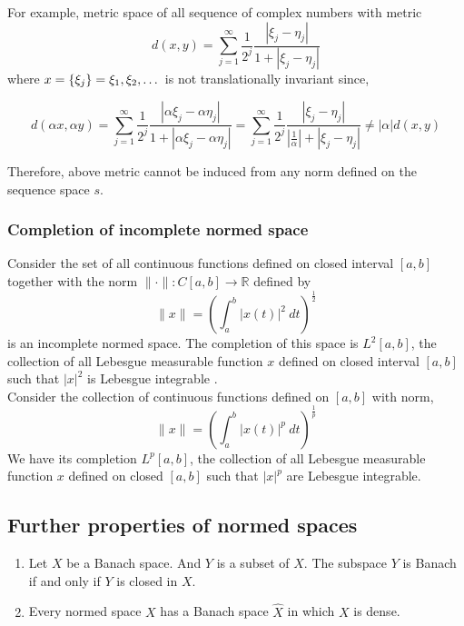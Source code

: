 	For example, metric space of all sequence of complex numbers with metric
	\[ d(x,y) = \sum_{j = 1}^\infty \frac{1}{2^j} \frac{|\xi_j-\eta_j|}{1+|\xi_j-\eta_j|} \]
	where $x = \left\{\xi_j\right\} = \xi_1,\xi_2,\dots$ is not translationally invariant since,

	\[ d(\alpha x, \alpha y) = \sum_{j = 1}^\infty \frac{1}{2^j} \frac{|\alpha\xi_j-\alpha\eta_j|}{1+|\alpha\xi_j - \alpha\eta_j|} = \sum_{j=1}^\infty \frac{1}{2^j} \frac{|\xi_j - \eta_j|}{\left|\frac{1}{\alpha}\right|+|\xi_j-\eta_j|} \ne |\alpha| d(x,y) \]

	Therefore, above metric cannot be induced from any norm defined on the sequence space $s$.
	
\subsubsection{Completion of incomplete normed space}
	Consider the set of all continuous functions defined on closed interval $[a,b]$ together with the norm $\| \cdot \| : C[a,b] \to \mathbb{R}$ defined by
	\[ \|x\| = \left( \int_a^b |x(t)|^2\ dt \right)^\frac{1}{2} \]
	is an incomplete normed space.
	The completion of this space is $L^2[a,b]$, the collection of all Lebesgue measurable function $x$ defined on closed interval $[a,b]$ such that $|x|^2$ is Lebesgue integrable .\\

	Consider the collection of continuous functions defined on $[a,b]$ with norm,
	\[ \|x\| = \left( \int_a^b |x(t)|^p\ dt \right)^\frac{1}{p} \]
	We have its completion $L^p[a,b]$, the collection of all Lebesgue measurable function $x$ defined on closed $[a,b]$ such that $|x|^p$ are Lebesgue integrable.

\subsection{Further properties of normed spaces}
\begin{important}
\begin{enumerate}
	\item Let $X$ be a Banach space.
		And $Y$ is a subset of $X$.
		The subspace $Y$ is Banach if and only if $Y$ is closed in $X$.
	\item Every normed space $X$ has a Banach space $\hat{X}$ in which $X$ is dense.
\end{enumerate}
\end{important}

